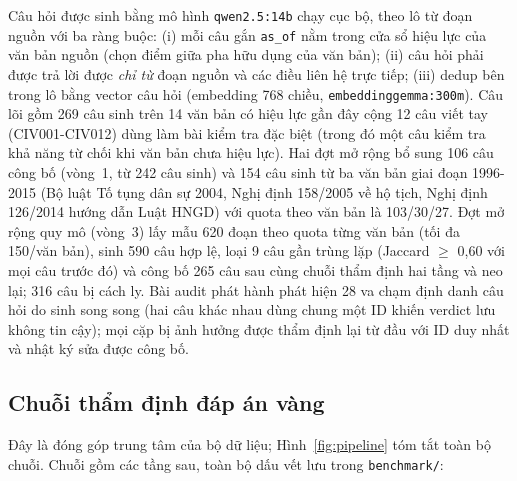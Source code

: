 \documentclass[11pt,a4paper]{article}
\begin{document}
Câu hỏi được sinh bằng mô hình \texttt{qwen2.5:14b} chạy cục bộ, theo lô từ đoạn nguồn với ba ràng buộc: (i) mỗi câu gắn \texttt{as\_of} nằm trong cửa sổ hiệu lực của văn bản nguồn (chọn điểm giữa pha hữu dụng của văn bản); (ii) câu hỏi phải được trả lời được \emph{chỉ từ} đoạn nguồn và các điều liên hệ trực tiếp; (iii) dedup bên trong lô bằng vector câu hỏi (embedding 768 chiều, \texttt{embeddinggemma:300m}). Câu lõi gồm 269 câu sinh trên 14 văn bản có hiệu lực gần đây cộng 12 câu viết tay (CIV001-CIV012) dùng làm bài kiểm tra đặc biệt (trong đó một câu kiểm tra khả năng từ chối khi văn bản chưa hiệu lực). Hai đợt mở rộng bổ sung 106 câu công bố (vòng~1, từ 242 câu sinh) và 154 câu sinh từ ba văn bản giai đoạn 1996-2015 (Bộ luật Tố tụng dân sự 2004, Nghị định 158/2005 về hộ tịch, Nghị định 126/2014 hướng dẫn Luật HNGD) với quota theo văn bản là 103/30/27. Đợt mở rộng quy mô (vòng~3) lấy mẫu 620 đoạn theo quota từng văn bản (tối đa 150/văn bản), sinh 590 câu hợp lệ, loại 9 câu gần trùng lặp (Jaccard $\ge$ 0,60 với mọi câu trước đó) và công bố 265 câu sau cùng chuỗi thẩm định hai tầng và neo lại; 316 câu bị cách ly. Bài audit phát hành phát hiện 28 va chạm định danh câu hỏi do sinh song song (hai câu khác nhau dùng chung một ID khiến verdict lưu không tin cậy); mọi cặp bị ảnh hưởng được thẩm định lại từ đầu với ID duy nhất và nhật ký sửa được công bố.

\subsection{Chuỗi thẩm định đáp án vàng}

Đây là đóng góp trung tâm của bộ dữ liệu; Hình~\ref{fig:pipeline} tóm tắt toàn bộ chuỗi. Chuỗi gồm các tầng sau, toàn bộ dấu vết lưu trong \texttt{benchmark/}:
\end{document}
